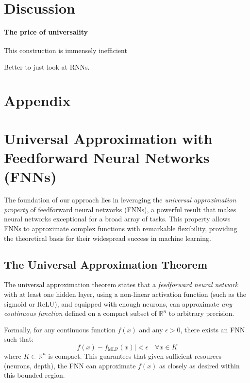 \documentclass{article}
\theoremstyle{definition}
\theoremstyle{remark}
\begin{document}
\section{Discussion}


\paragraph{The price of universality}
This construction is immensely inefficient

Better to just look at RNNs.



\newpage




\newpage
\section{Appendix}
\section{Universal Approximation with Feedforward Neural Networks (FNNs)}

The foundation of our approach lies in leveraging the \textit{universal approximation property} of feedforward neural networks (FNNs), a powerful result that makes neural networks exceptional for a broad array of tasks. This property allows FNNs to approximate complex functions with remarkable flexibility, providing the theoretical basis for their widespread success in machine learning.

\subsection{The Universal Approximation Theorem}

The universal approximation theorem states that a \textit{feedforward neural network} with at least one hidden layer, using a non-linear activation function (such as the sigmoid or ReLU), and equipped with enough neurons, can approximate \textit{any continuous function} defined on a compact subset of \(\mathbb{R}^n\) to arbitrary precision.

Formally, for any continuous function \(f(x)\) and any \(\epsilon > 0\), there exists an FNN such that:
\[
| f(x) - f_{\text{MLP}}(x) | < \epsilon \quad \forall x \in K
\]
where \(K \subset \mathbb{R}^n\) is compact. This guarantees that given sufficient resources (neurons, depth), the FNN can approximate \(f(x)\) as closely as desired within this bounded region.
\end{document}
